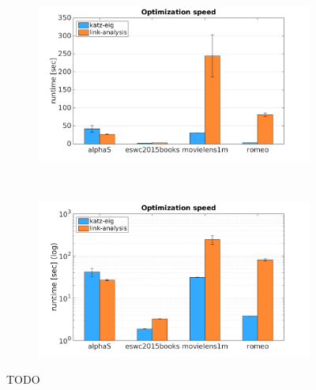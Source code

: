 
\begin{figure}[h!]
    \begin{subfigure}[h!]{0.5\textwidth}
        \includegraphics[width=\textwidth]{fig/comp/comp_rec_opt_time.png}
        \caption{}
    \end{subfigure}
    ~
    \begin{subfigure}[h!]{0.5\textwidth}
        \includegraphics[width=\textwidth]{fig/comp/comp_rec_opt_time_log.png}
        \caption{}
    \end{subfigure}
    \caption{TODO}
\end{figure}

